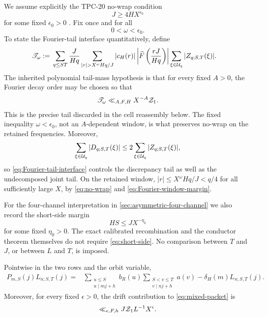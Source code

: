 We assume explicitly the TPC-20 no-wrap condition
\begin{equation}
 J\ge4HX^{\epsilon_0}
 \label{eq:no-wrap}
\end{equation}
for some fixed \(\epsilon_0>0\) \citep{WangTPC20}.  Fix once and for
all
\begin{equation}
 0<\omega<\epsilon_0.
 \label{eq:Fourier-window-margin}
\end{equation}
To state the Fourier-tail interface quantitatively, define
\begin{align}
 \mathscr T_\omega
 :={}&
 \sum_{q\le ST}\frac{J}{Hq}
 \sum_{|r|>X^\omega Hq/J}|c_H(r)|
 \left|\widehat F\left(\frac{rJ}{Hq}\right)\right|
 \sum_{\xi\in\cU_q}|Z_{q;S,T}(\xi)|.
 \label{eq:Fourier-tail-mass}
\end{align}
The inherited polynomial tail-mass hypothesis is that for every fixed
\(A>0\), the Fourier decay order may be chosen so that
\begin{equation}
 \mathscr T_\omega\ll_{A,F,H}X^{-A}\mathcal Z_1.
 \label{eq:Fourier-tail-interface}
\end{equation}
This is the precise tail discarded in the cell reassembly below.  The
fixed inequality \(\omega<\epsilon_0\), not an \(A\)-dependent window,
is what preserves no-wrap on the retained frequencies.
Moreover,
\[
 \sum_{\xi\in\mathcal U_q}|D_{q;S,T}(\xi)|
 \le 2\sum_{\xi\in\mathcal U_q}|Z_{q;S,T}(\xi)|,
\]
so \eqref{eq:Fourier-tail-interface} controls the discrepancy tail as
well as the undecomposed joint tail.  On the retained window,
\(|r|\le X^\omega Hq/J<q/4\) for all sufficiently large \(X\), by
\eqref{eq:no-wrap} and \eqref{eq:Fourier-window-margin}.

For the four-channel interpretation in
\cref{sec:asymmetric-four-channel} we also record the short-side margin
\begin{equation}
 HS\le JX^{-\eta_0}
 \label{eq:short-side}
\end{equation}
for some fixed \(\eta_0>0\).  The exact calibrated recombination and
the conductor theorem themselves do not require
\eqref{eq:short-side}.  No comparison between \(T\) and \(J\), or
between \(L\) and \(T\), is imposed.

\begin{proposition}
\label{prop:joint-minus-drift}
Pointwise in the two rows and the orbit variable,
\begin{align}
 P_{m,S}(j)L_{n;S,T}(j)
 ={}&
 \sum_{\substack{u\le S\\u\mid mj+h}}b_R(u)
 \sum_{\substack{S<v\le T\\v\mid nj+h}}a(v)
 -\delta_H(m)L_{n;S,T}(j).
 \label{eq:joint-minus-drift}
\end{align}
Moreover, for every fixed \(\epsilon>0\), the drift contribution to
\eqref{eq:mixed-packet} is
\begin{equation}
 \ll_{\epsilon,F,h}J\mathcal Z_1L^{-1}X^\epsilon.
 \label{eq:drift-packet-bound}
\end{equation}
\end{proposition}

